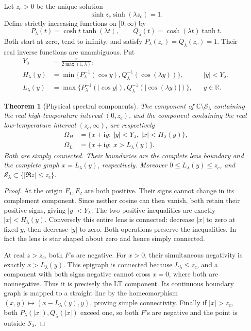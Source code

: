 \documentclass[11pt]{article}
\numberwithin{equation}{section}
\newtheorem{theorem}{Theorem}[section]
\theoremstyle{definition}
\newcommand{\C}{\mathbb C}
\newcommand{\R}{\mathbb R}
\newcommand{\ii}{\mathrm i}
\newcommand{\cS}{\mathcal S}
\newcommand{\OH}{\Omega_H}
\newcommand{\OL}{\Omega_L}
\begin{document}
Let \(z_c>0\) be the unique solution
\begin{equation}\label{eq:zc}
 \sinh z_c\sinh(\lambda z_c)=1.
\end{equation}
Define strictly increasing functions on \([0,\infty)\) by
\begin{equation}\label{eq:PQ}
 P_\lambda(t)=\cosh t\tanh(\lambda t),\qquad
 Q_\lambda(t)=\cosh(\lambda t)\tanh t.
\end{equation}
Both start at zero, tend to infinity, and satisfy
\(P_\lambda(z_c)=Q_\lambda(z_c)=1\). Their real inverse functions are
unambiguous. Put
\begin{align}
 Y_\lambda&=\frac{\pi}{2\max(1,\lambda)},\label{eq:Ylambda}\\
 H_\lambda(y)&=\min\{P_\lambda^{-1}(\cos y),
                       Q_\lambda^{-1}(\cos(\lambda y))\},
                       &&|y|<Y_\lambda,\label{eq:Hlambda}\\
 L_\lambda(y)&=\max\{P_\lambda^{-1}(|\cos y|),
                       Q_\lambda^{-1}(|\cos(\lambda y)|)\},
                       &&y\in\R.\label{eq:Llambda}
\end{align}

\begin{theorem}[Physical spectral components]\label{thm:components}
The component of \(\C\setminus\cS_\lambda\) containing the real
high-temperature interval \((0,z_c)\), and the component containing
the real low-temperature interval \((z_c,\infty)\), are respectively
\begin{align}
 \OH&=\{x+\ii y:\ |y|<Y_\lambda,
                         \ |x|<H_\lambda(y)\},\label{eq:OH}\\
 \OL&=\{x+\ii y:\ x>L_\lambda(y)\}.\label{eq:OL}
\end{align}
Both are simply connected. Their boundaries are the complete lens
boundary and the complete graph \(x=L_\lambda(y)\), respectively.
Moreover \(0\le L_\lambda(y)\le z_c\), and
\(\cS_\lambda\subset\{|\Re z|\le z_c\}\).
\end{theorem}
\begin{proof}
At the origin \(F_1,F_2\) are both positive. Their signs cannot change
in its complement component. Since neither cosine can then vanish,
both retain their positive signs, giving
\(|y|<Y_\lambda\). The two positive inequalities are exactly
\(|x|<H_\lambda(y)\). Conversely this entire lens is connected:
decrease \(|x|\) to zero at fixed \(y\), then decrease \(|y|\) to zero.
Both operations preserve the inequalities. In fact the lens is star
shaped about zero and hence simply connected.

At real \(z>z_c\), both \(F\)'s are negative. For \(x>0\), their
simultaneous negativity is exactly \(x>L_\lambda(y)\). This epigraph
is connected because \(L_\lambda\le z_c\), and a component with both
signs negative cannot cross \(x=0\), where both are nonnegative.
Thus it is precisely the LT component. Its continuous boundary graph
is mapped to a straight line by the homeomorphism
\((x,y)\mapsto(x-L_\lambda(y),y)\), proving simple connectivity.
Finally if \(|x|>z_c\), both \(P_\lambda(|x|),Q_\lambda(|x|)\)
exceed one, so both \(F\)'s are negative and the point is outside
\(\cS_\lambda\).
\end{proof}
\end{document}
